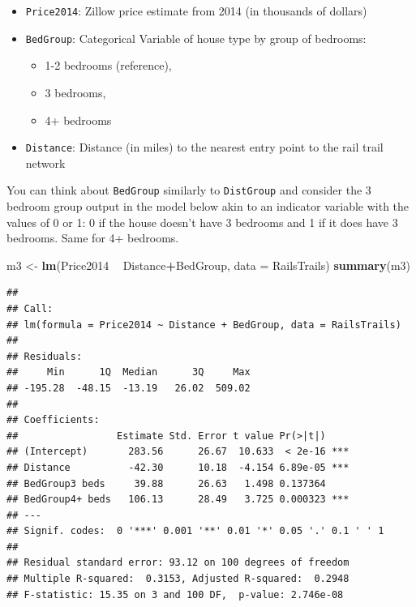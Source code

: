 \documentclass[]{article}
\newenvironment{Shaded}{\begin{snugshade}}{\end{snugshade}}
\newcommand{\DataTypeTok}[1]{\textcolor[rgb]{0.13,0.29,0.53}{#1}}
\newcommand{\KeywordTok}[1]{\textcolor[rgb]{0.13,0.29,0.53}{\textbf{#1}}}
\newcommand{\NormalTok}[1]{#1}
\newcommand{\OperatorTok}[1]{\textcolor[rgb]{0.81,0.36,0.00}{\textbf{#1}}}
\newcommand{\StringTok}[1]{\textcolor[rgb]{0.31,0.60,0.02}{#1}}
\providecommand{\tightlist}{%
  \setlength{\itemsep}{0pt}\setlength{\parskip}{0pt}}
\begin{document}
\begin{itemize}
\tightlist
\item
  \texttt{Price2014}: Zillow price estimate from 2014 (in thousands of
  dollars)
\item
  \texttt{BedGroup}: Categorical Variable of house type by group of
  bedrooms:

  \begin{itemize}
  \tightlist
  \item
    1-2 bedrooms (reference),
  \item
    3 bedrooms,
  \item
    4+ bedrooms
  \end{itemize}
\item
  \texttt{Distance}: Distance (in miles) to the nearest entry point to
  the rail trail network
\end{itemize}

You can think about \texttt{BedGroup} similarly to \texttt{DistGroup}
and consider the 3 bedroom group output in the model below akin to an
indicator variable with the values of 0 or 1: 0 if the house doesn't
have 3 bedrooms and 1 if it does have 3 bedrooms. Same for 4+ bedrooms.

\begin{Shaded}
\begin{Highlighting}[]
\NormalTok{m3 <-}\StringTok{ }\KeywordTok{lm}\NormalTok{(Price2014 }\OperatorTok{~}\StringTok{ }\NormalTok{Distance}\OperatorTok{+}\NormalTok{BedGroup, }\DataTypeTok{data =}\NormalTok{ RailsTrails)}
\KeywordTok{summary}\NormalTok{(m3)}
\end{Highlighting}
\end{Shaded}

\begin{verbatim}
## 
## Call:
## lm(formula = Price2014 ~ Distance + BedGroup, data = RailsTrails)
## 
## Residuals:
##     Min      1Q  Median      3Q     Max 
## -195.28  -48.15  -13.19   26.02  509.02 
## 
## Coefficients:
##                 Estimate Std. Error t value Pr(>|t|)    
## (Intercept)       283.56      26.67  10.633  < 2e-16 ***
## Distance          -42.30      10.18  -4.154 6.89e-05 ***
## BedGroup3 beds     39.88      26.63   1.498 0.137364    
## BedGroup4+ beds   106.13      28.49   3.725 0.000323 ***
## ---
## Signif. codes:  0 '***' 0.001 '**' 0.01 '*' 0.05 '.' 0.1 ' ' 1
## 
## Residual standard error: 93.12 on 100 degrees of freedom
## Multiple R-squared:  0.3153, Adjusted R-squared:  0.2948 
## F-statistic: 15.35 on 3 and 100 DF,  p-value: 2.746e-08
\end{verbatim}
\end{document}
